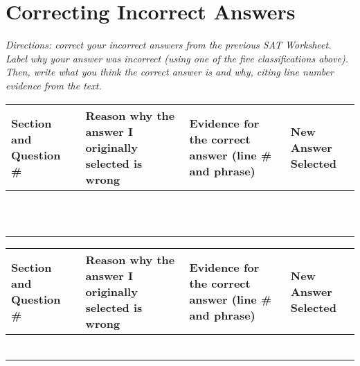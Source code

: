 \section{Correcting Incorrect Answers}

\textit{Directions: correct your incorrect answers from the previous SAT Worksheet. Label why your answer
was incorrect (using one of the five classifications above). Then, write what you think the correct
answer is and why, citing line number evidence from the text.}

\bigskip
\begin{tabularx}{\textwidth}{|X|p{2in}|p{2in}|X|}\hline
Section and Question \# & Reason why the answer I originally selected is wrong & Evidence for the correct answer (line \# and phrase) & New Answer Selected\\\hline
& & &\\[2ex]\hline
& & &\\[2ex]\hline
& & &\\[2ex]\hline
& & &\\[2ex]\hline
& & &\\[2ex]\hline
& & &\\[2ex]\hline
& & &\\[2ex]\hline
& & &\\[2ex]\hline
& & &\\[2ex]\hline
& & &\\[2ex]\hline
& & &\\[2ex]\hline
\end{tabularx}

\newpage
\begin{tabularx}{\textwidth}{|X|p{2in}|p{2in}|X|}\hline
Section and Question \# & Reason why the answer I originally selected is wrong & Evidence for the correct answer (line \# and phrase) & New Answer Selected\\\hline
& & &\\[2ex]\hline
& & &\\[2ex]\hline
& & &\\[2ex]\hline
& & &\\[2ex]\hline
& & &\\[2ex]\hline
& & &\\[2ex]\hline
\end{tabularx}